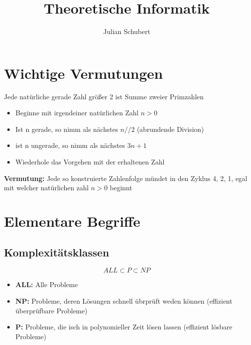\documentclass[14pt]{article}
\title{Theoretische Informatik}
\author{Julian Schubert}
\begin{document}
    \maketitle
    \tableofcontents

    \newpage

    \section{Wichtige Vermutungen}
    \begin{definition}
        Jede natürliche gerade Zahl größer 2 ist Summe zweier Primzahlen
    \end{definition}
    \begin{definition}
        \begin{itemize}
            \item Beginne mit irgendeiner natürlichen Zahl $n > 0$
            \item Ist n gerade, so nimm als nächstes $n // 2$ (abrundende Division)
            \item ist n ungerade, so nimm als nächstes $3n + 1$
            \item Wiederhole das Vorgehen mit der erhaltenen Zahl
        \end{itemize}
        \noindent
        \textbf{Vermutung:} Jede so konstruierte Zahlenfolge mündet in den Zyklus
            4, 2, 1, egal mit welcher natürlichen zahl $n > 0$ beginnt
    \end{definition}
    
    \section{Elementare Begriffe}

        \subsection{Komplexitätsklassen}
        \[
            ALL \subset P \subset NP
        \]
        \begin{itemize}
            \item \textbf{ALL:} Alle Probleme
            \item \textbf{NP:} Probleme, deren Lösungen schnell übrprüft weden können
                (effizient überprüfbare Probleme)
            \item \textbf{P:} Probleme, die isch in polynomieller Zeit lösen lassen 
                (effizient lösbare Probleme)
        \end{itemize}
\end{document}
